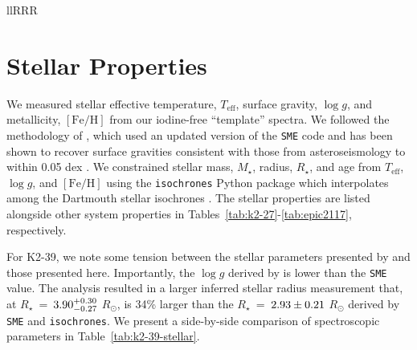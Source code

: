 \documentclass[preprint2]{aastex6}
\newcommand{\SME}{\texttt{SME}\xspace}
\newcommand{\Mstar}{\ensuremath{M_{\star}}\xspace}
\newcommand{\Rstar}{\ensuremath{R_{\star}}\xspace}
\newcommand{\fe}{\ensuremath{\mathrm{[Fe/H]}}\xspace}
\newcommand{\teff}{$T_{\mathrm{eff}}$\xspace}
\newcommand{\logg}{\ensuremath{\log g}\xspace}
\newcommand{\ms}{\ensuremath{\mathrm{m}\,\mathrm{s}^{-1}}\xspace}
\newcommand{\Rsun}{\ensuremath{R_{\odot}}\xspace }
\newcommand{\bjdtdb}{\ensuremath{\mathrm{BJD}_\mathrm{TBD}}\xspace}
\begin{document}
\begin{deluxetable}{llRRR}
\tablewidth{-0pt}
\tabletypesize{\footnotesize}
\tablehead{
        \colhead{Star} & 
        \colhead{Inst.} & 
        \colhead{Time} & 
        \colhead{RV} & 
        \colhead{$\sigma$(RV)}\\
        \colhead{} & 
        \colhead{} & 
        \colhead{\bjdtdb} & 
        \colhead{\ms} & 
        \colhead{\ms}
        }
\startdata

\enddata
{}
\end{deluxetable}

\section{Stellar Properties}
\label{sec:stellar}
We measured stellar effective temperature, \teff, surface gravity, \logg, and metallicity, \fe from our iodine-free ``template'' spectra. We followed the methodology of \cite{Brewer16}, which used an updated version of the \SME code and has been shown to recover surface gravities consistent with those from asteroseismology to within 0.05 dex \citep{Brewer15}. We constrained stellar mass, \Mstar, radius, \Rstar, and age from \teff, \logg, and \fe using the {\tt isochrones} Python package \citep{Morton15} which interpolates among the Dartmouth stellar isochrones \citep{Dotter08}. The stellar properties are listed alongside other system properties in Tables~\ref{tab:k2-27}-\ref{tab:epic2117}, respectively. 

For K2-39, we note some tension between the stellar parameters presented by \cite{VanEylen16b} and those presented here. Importantly, the \logg derived by \cite{VanEylen16b} is lower than the \SME value. The \cite{VanEylen16b} analysis resulted in a larger inferred stellar radius measurement that, at \Rstar~=~$\val{K2-39-star-VE}{radius}~$\Rsun, is 34\% larger than the \Rstar~=~$\val{K2-39-star}{radius}~$\Rsun derived by \SME and {\tt isochrones}. We present a side-by-side comparison of spectroscopic parameters in Table~\ref{tab:k2-39-stellar}. 
\end{document}
